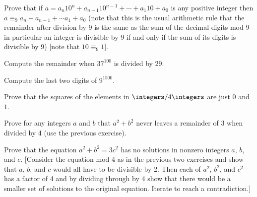 
\begin{exercise}
	Prove that if $a = a_n 10^n + a_{n-1} 10^{n-1} + \cdots + a_1 10 + a_0$ is any positive integer then $a \equiv_9 a_n + a_{n-1} + \cdots a_1 + a_0$ (note that this is the usual arithmetic rule that the remainder after division by 9 is the same as the sum of the decimal digits mod 9--in particular an integer is divisible by 9 if and only if the sum of its digits is divisible by 9) [note that $10 \equiv_9 1$].
\end{exercise}


\begin{exercise}
	Compute the remainder when $37^{100}$ is divided by 29.
\end{exercise}


\begin{exercise}
	Compute the last two digits of $9^{1500}$.
\end{exercise}


\begin{exercise}
	Prove that the squares of the elements in $\integers/4\integers$ are just $\bar{0}$ and $\bar{1}$.
\end{exercise}


\begin{exercise}
	Prove for any integers $a$ and $b$ that $a^2 + b^2$ never leaves a remainder of 3 when divided by 4 (use the previous exercise).
\end{exercise}


\begin{exercise}
	Prove that the equation $a^2 + b^2 = 3c^2$ has no solutions in nonzero integers $a$, $b$, and $c$. [Consider the equation mod 4 as in the previous two exercises and show that $a$, $b$, and $c$ would all have to be divisible by 2. Then each of $a^2$, $b^2$, and $c^2$ has a factor of 4 and by dividing through by 4 show that there would be a smaller set of solutions to the original equation. Iterate to reach a contradiction.]
\end{exercise}

